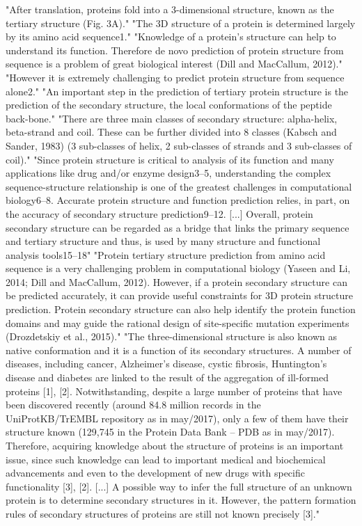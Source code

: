 "After translation, proteins fold into a 3-dimensional structure, known as the tertiary structure (Fig. 3A)."\cite{Jurtz2017}
"The 3D structure of a protein is determined largely by its amino acid sequence1." \cite{Wang2016}
"Knowledge of a protein’s structure can help to understand its function. Therefore de novo prediction of protein structure from sequence is a problem of great biological interest (Dill and MacCallum, 2012)." \cite{Jurtz2017}
"However it is extremely challenging to predict protein structure from sequence alone2." \cite{Wang2016}
"An important step in the prediction of tertiary protein structure is the prediction of the secondary structure, the local conformations of the peptide back-bone." \cite{Jurtz2017}
"There are three main classes of secondary structure: alpha-helix, beta-strand and coil. These can be further divided into 8 classes (Kabsch and Sander, 1983) (3 sub-classes of helix, 2 sub-classes of strands and 3 sub-classes of coil)." \cite{Jurtz2017}
"Since protein structure is critical to analysis of its function and many applications like drug and/or enzyme design3–5, understanding the complex sequence-structure relationship is one of the greatest challenges in computational biology6–8. Accurate protein structure and function prediction relies, in part, on the accuracy of secondary structure prediction9–12. [...] Overall, protein secondary structure can be regarded as a bridge that links the primary sequence and tertiary structure and thus, is used by many structure and functional analysis tools15–18" \cite{Wang2016}
"Protein tertiary structure prediction from amino acid sequence is a very challenging problem in computational biology (Yaseen and Li, 2014; Dill and MacCallum, 2012). However, if a protein secondary structure can be predicted accurately, it can provide useful constraints for 3D protein structure prediction. Protein secondary structure can also help identify the protein function domains and may guide the rational design of site-specific mutation experiments (Drozdetskiy et al., 2015)." \cite{Fang2017}
"The three-dimensional structure is also known as native conformation and it is a function of its secondary structures. A number of diseases, including cancer, Alzheimer’s disease, cystic fibrosis, Huntington’s disease and diabetes are linked to the result of the aggregation of ill-formed proteins [1], [2]. Notwithstanding, despite a large number of proteins that have been discovered recently (around 84.8 million records in the UniProtKB/TrEMBL repository as in may/2017), only a few of them have their structure known (129,745 in the Protein Data Bank – PDB as in may/2017). Therefore, acquiring knowledge about the structure of proteins is an important issue, since such knowledge can lead to important medical and biochemical advancements and even to the development of new drugs with specific functionality [3], [2]. [...] A possible way to infer the full structure of an unknown protein is to determine secondary structures in it. However, the pattern formation rules of secondary structures of proteins are still not known precisely [3]." \cite{Hattori2017}
